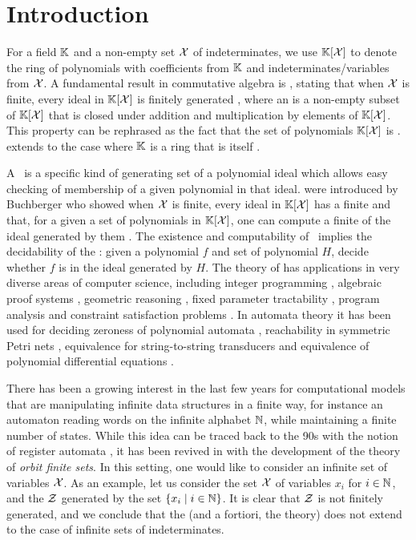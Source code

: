 \section{Introduction}
\label{sec:intro}
\AP For a field $\mathbb{K}$ and a non-empty set $\mathcal{X}$ of indeterminates, we use
$\mathbb{K}[\mathcal{X}]$ to denote the ring of polynomials with coefficients from $\mathbb{K}$
and indeterminates/variables from $\mathcal{X}$. A fundamental result in commutative
algebra is , stating that when $\mathcal{X}$ is finite,
every ideal in $\mathbb{K}[\mathcal{X}]$ is finitely generated \cite{HILB1890}, where an
 is a non-empty subset of $\mathbb{K}[\mathcal{X}]$ that is closed under
addition and multiplication by elements of $\mathbb{K}[\mathcal{X}]$. This property can
be rephrased as the fact that the set of polynomials $\mathbb{K}[\mathcal{X}]$ is
.  extends to the case where $\mathbb{K}$
is a ring that is itself  \cite[Theorem 4.1]{Lang02}.

\AP A \intro*\Grb\ is a specific kind of generating set of a polynomial ideal
which allows easy checking of membership of a given polynomial in that ideal.
 were introduced by Buchberger who showed when $\mathcal{X}$ is
finite, every ideal in $\mathbb{K}[\mathcal{X}]$ has a finite  and
that, for a given a set of polynomials in $\mathbb{K}[\mathcal{X}]$, one can compute a
finite  of the ideal generated by them \cite{BUCH76}. The
existence and computability of \Grbs\ implies the decidability of the
: given a polynomial $f$ and set of polynomial
$H$, decide whether $f$ is in the ideal generated by $H$. The theory of
 has applications in very diverse areas of computer
science, including integer programming \cite{Sturmfels96}, algebraic proof
systems \cite{algProof}, geometric reasoning \cite{Cox2015chGeom}, fixed
parameter tractability \cite{ACDM22}, program analysis \cite{SSM04} and
constraint satisfaction problems \cite{Mas21}.
In automata theory it has been used for deciding zeroness of polynomial
automata \cite{BEDUSHWO17}, reachability in symmetric Petri nets \cite{MAME82},
equivalence for string-to-string transducers \cite{HONKALA00} and equivalence
of polynomial differential equations \cite{CLEMENTE24}. 

\AP There has been a growing interest in the last few years for computational
models that are manipulating infinite data structures in a finite way, for
instance an automaton reading words on the infinite alphabet $\mathbb{N}$, while
maintaining a finite number of states. While this idea can be traced back to
the 90s with the notion of register automata \cite{KAFR94}, it has been revived
in with the development of the theory of \emph{orbit finite sets}. In this
setting, one would like to consider an infinite set of variables $\mathcal{X}$. As an
example, let us consider the set $\mathcal{X}$ of variables $x_i$ for $i \in \mathbb{N}$, and
the  $\mathcal{Z}$ generated by the set $\{ x_i \mid i \in \mathbb{N} \}$. It is
clear that $\mathcal{Z}$ is not finitely generated, and we conclude that the
 (and a fortiori, the 
theory) does not extend to the case of infinite sets of indeterminates.

